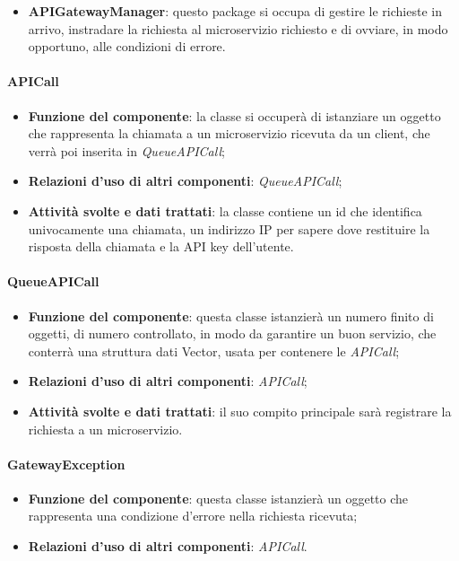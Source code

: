 \begin{itemize}
	\item \textbf{APIGatewayManager}: questo package si occupa di gestire le richieste in arrivo, instradare la richiesta al microservizio richiesto e di ovviare, in modo opportuno, alle condizioni di errore.
\end{itemize}

\paragraph{APICall}
\begin{itemize}
	\item \textbf{Funzione del componente}: la classe si occuper\`{a} di istanziare un oggetto che rappresenta la chiamata a un microservizio ricevuta da un client, che verrà poi inserita in \textit{QueueAPICall};
	\item \textbf{Relazioni d'uso di altri componenti}: \textit{QueueAPICall};
	\item \textbf{Attività svolte e dati trattati}: la classe contiene un id che identifica univocamente una chiamata, un indirizzo IP per sapere dove restituire la risposta della chiamata e la API key dell'utente.
\end{itemize}

\paragraph{QueueAPICall}
\begin{itemize}
	\item \textbf{Funzione del componente}: questa classe istanzier\`{a} un numero finito di oggetti, di numero controllato, in modo da garantire un buon servizio, che conterr\`{a} una struttura dati Vector, usata per contenere le \textit{APICall};
	\item \textbf{Relazioni d'uso di altri componenti}: \textit{APICall};
	\item \textbf{Attività svolte e dati trattati}: il suo compito principale sar\`{a} registrare la richiesta a un microservizio.
\end{itemize}

\paragraph{GatewayException}
\begin{itemize}
	\item \textbf{Funzione del componente}: questa classe istanzier\`{a} un oggetto che rappresenta una condizione d'errore nella richiesta ricevuta;
	\item \textbf{Relazioni d'uso di altri componenti}: \textit{APICall}.
\end{itemize}

